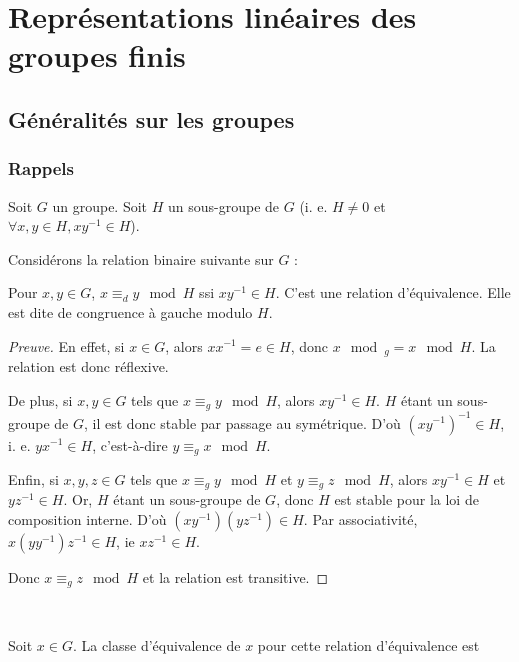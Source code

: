 \documentclass[french]{book}
\title{\bsc{Théorie des représentations}}
\date{2023-2024}
\author{Yves \bsc{Aubry}\\ Bureau : M-147A \\ \href{yves.aubry@univ-tln.fr}{yves.aubry@univ-tln.fr}\\Joachim \bsc{Asch}}
\theoremstyle{definition}
\theoremstyle{remark}
\begin{document}
\maketitle

\tableofcontents

\part{Représentations linéaires des groupes finis}

\chapter{Généralités sur les groupes}

\section{Rappels}


Soit $G$ un groupe. Soit $H$ un sous-groupe de $G$ (i. e. $H \neq 0$ et $\forall x, y \in H, x y ^{-1} \in H$).

Considérons la relation binaire suivante sur $G$ :

Pour $x, y \in G$, $x \equiv _{d} y \mod H$ ssi $x y ^{-1} \in H$. C'est une relation d'équivalence. Elle est dite de congruence à gauche modulo $H$.

\begin{proof}[Preuve]
  En effet, si $x \in G$, alors $x x ^{-1} = e \in H$, donc $x \mod _{g} = x \mod H$. La relation est donc réflexive.

  De plus, si $x, y \in G$ tels que $x \equiv _{g} y \mod H$, alors $x y ^{-1} \in H$. $H$ étant un sous-groupe de $G$, il est donc stable par passage au symétrique. D'où $(x y ^{-1} ) ^{-1}  \in H$, i. e. $y x ^{-1} \in H$, c'est-à-dire $y \equiv _{g} x \mod H$.

  Enfin, si $x, y,z \in G$ tels que $x \equiv _{g} y \mod H$ et $y \equiv _{g} z \mod H$, alors $x y ^{-1} \in H$ et $yz ^{-1} \in H$. Or, $H$ étant un sous-groupe de $G$, donc $H$ est stable pour la loi de composition interne. D'où $(x y ^{-1} )(y z ^{-1} ) \in H$. Par associativité, $x (y y ^{-1} ) z ^{-1}  \in H$, ie $x z ^{-1}  \in H$.

  Donc $x \equiv _{g} z \mod H $ et la relation est transitive.
\end{proof}

\

Soit $x \in G$. La classe d'équivalence de $x$ pour cette relation d'équivalence est
\end{document}
